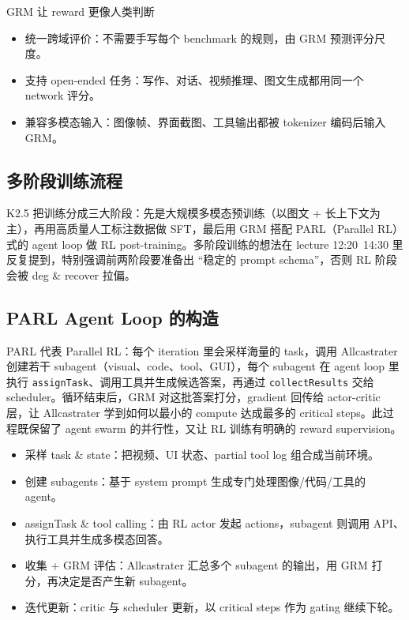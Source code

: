 \documentclass[a4paper]{article}
\begin{document}
\begin{knowledgebox}{GRM 让 reward 更像人类判断}
\begin{itemize}
    \item 统一跨域评价：不需要手写每个 benchmark 的规则，由 GRM 预测评分尺度。
    \item 支持 open-ended 任务：写作、对话、视频推理、图文生成都用同一个 network 评分。
    \item 兼容多模态输入：图像帧、界面截图、工具输出都被 tokenizer 编码后输入 GRM。
\end{itemize}
\end{knowledgebox}

\subsection{多阶段训练流程}
K2.5 把训练分成三大阶段：先是大规模多模态预训练（以图文 + 长上下文为主），再用高质量人工标注数据做 SFT，最后用 GRM 搭配 PARL（Parallel RL）式的 agent loop 做 RL post-training。多阶段训练的想法在 lecture 12:20~14:30 里反复提到，特别强调前两阶段要准备出 ``稳定的 prompt schema''，否则 RL 阶段会被 deg \& recover 拉偏。

\subsection{PARL Agent Loop 的构造}
PARL 代表 Parallel RL：每个 iteration 里会采样海量的 task，调用 Allcastrater 创建若干 subagent（visual、code、tool、GUI），每个 subagent 在 agent loop 里执行 \texttt{assignTask}、调用工具并生成候选答案，再通过 \texttt{collectResults} 交给 scheduler。循环结束后，GRM 对这批答案打分，gradient 回传给 actor-critic 层，让 Allcastrater 学到如何以最小的 compute 达成最多的 critical steps。此过程既保留了 agent swarm 的并行性，又让 RL 训练有明确的 reward supervision。
\begin{itemize}
    \item 采样 task \& state：把视频、UI 状态、partial tool log 组合成当前环境。
    \item 创建 subagents：基于 system prompt 生成专门处理图像/代码/工具的 agent。
    \item assignTask \& tool calling：由 RL actor 发起 actions，subagent 则调用 API、执行工具并生成多模态回答。
    \item 收集 + GRM 评估：Allcastrater 汇总多个 subagent 的输出，用 GRM 打分，再决定是否产生新 subagent。
    \item 迭代更新：critic 与 scheduler 更新，以 critical steps 作为 gating 继续下轮。
\end{itemize}
\end{document}
